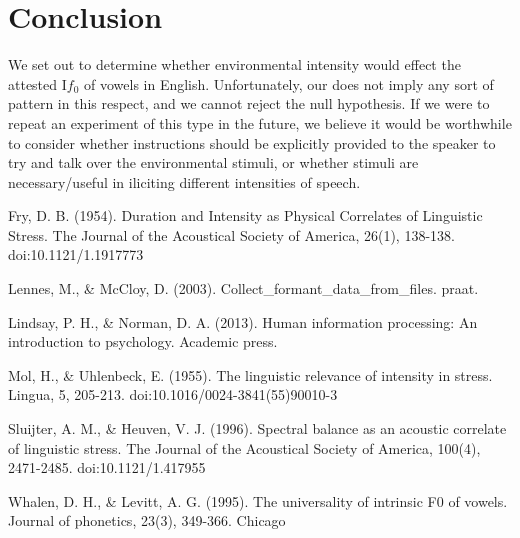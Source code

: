 \documentclass[12pt]{article}
\begin{document}
	\section{Conclusion}
	We set out to determine whether environmental intensity would effect the attested I$f_0$ of vowels in English.  Unfortunately, our does not imply any sort of pattern in this respect, and we cannot reject the null hypothesis.  If we were to repeat an experiment of this type in the future, we believe it would be worthwhile to consider whether instructions should be explicitly provided to the speaker to try and talk over the environmental stimuli, or whether stimuli are necessary/useful in iliciting different intensities of speech.
	\pagebreak
\begin{thebibliography}{1}
	Fry, D. B. (1954). Duration and Intensity as Physical Correlates of Linguistic Stress. The Journal of the Acoustical Society of America, 26(1), 138-138. doi:10.1121/1.1917773
	
	Lennes, M., \& McCloy, D. (2003). Collect\_formant\_data\_from\_files. praat.
	
	Lindsay, P. H., \& Norman, D. A. (2013). Human information processing: An introduction to psychology. Academic press.
	
	Mol, H., \& Uhlenbeck, E. (1955). The linguistic relevance of intensity in stress. Lingua, 5, 205-213. doi:10.1016/0024-3841(55)90010-3
	
	Sluijter, A. M., \& Heuven, V. J. (1996). Spectral balance as an acoustic correlate of linguistic stress. The Journal of the Acoustical Society of America, 100(4), 2471-2485. doi:10.1121/1.417955
	
	Whalen, D. H., \& Levitt, A. G. (1995). The universality of intrinsic F0 of vowels. Journal of phonetics, 23(3), 349-366.
	Chicago	
	
	
	
\end{thebibliography}
\end{document}
